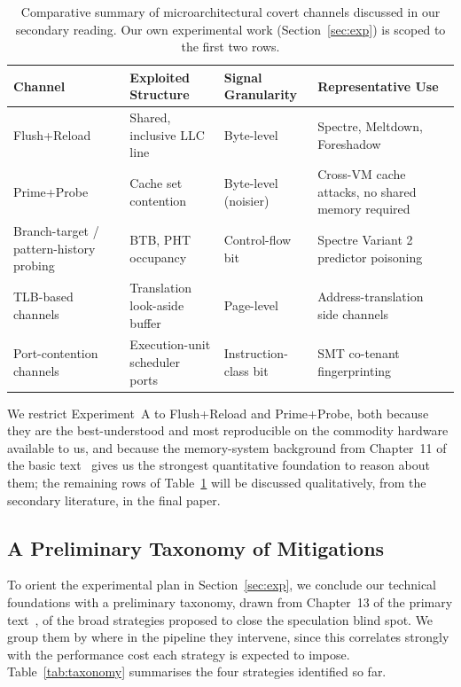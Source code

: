 \documentclass[11pt,a4paper]{article}
\begin{document}
\begin{table}[h]
\centering
\begin{tabular}{@{}p{3.2cm}p{4.4cm}p{2.2cm}p{3.4cm}@{}}
\toprule
\textbf{Channel} & \textbf{Exploited Structure} & \textbf{Signal Granularity} & \textbf{Representative Use} \\
\midrule
Flush+Reload & Shared, inclusive LLC line & Byte-level & Spectre, Meltdown, Foreshadow \\
\addlinespace
Prime+Probe & Cache set contention & Byte-level (noisier) & Cross-VM cache attacks, no shared memory required \\
\addlinespace
Branch-target / pattern-history probing & BTB, PHT occupancy & Control-flow bit & Spectre Variant 2 predictor poisoning \\
\addlinespace
TLB-based channels & Translation look-aside buffer & Page-level & Address-translation side channels \\
\addlinespace
Port-contention channels & Execution-unit scheduler ports & Instruction-class bit & SMT co-tenant fingerprinting \\
\bottomrule
\end{tabular}
\caption{Comparative summary of microarchitectural covert channels discussed
in our secondary reading. Our own experimental work (Section~\ref{sec:exp})
is scoped to the first two rows.}
\label{tab:channels}
\end{table}

We restrict Experiment~A to Flush+Reload and Prime+Probe, both because they
are the best-understood and most reproducible on the commodity hardware
available to us, and because the memory-system background from Chapter~11 of
the basic text~\cite{sarangi2025basic} gives us the strongest quantitative
foundation to reason about them; the remaining rows of Table~\ref{tab:channels}
will be discussed qualitatively, from the secondary literature, in the final
paper.

\subsection{A Preliminary Taxonomy of Mitigations}
\label{sec:mitigations}

To orient the experimental plan in Section~\ref{sec:exp}, we conclude our
technical foundations with a preliminary taxonomy, drawn from Chapter~13 of the
primary text~\cite{sarangi2023nextgen}, of the broad strategies proposed to
close the speculation blind spot. We group them by where in the pipeline they
intervene, since this correlates strongly with the performance cost each
strategy is expected to impose. Table~\ref{tab:taxonomy} summarises the four
strategies identified so far.
\end{document}
